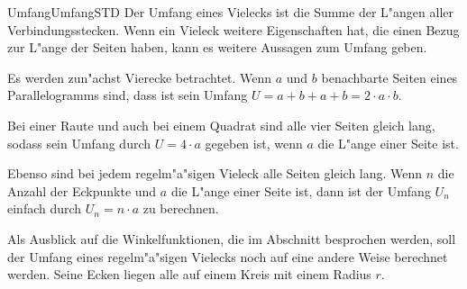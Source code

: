 \begin{MXContent}{Umfang}{Umfang}{STD}
Der Umfang eines Vielecks ist die Summe der L"angen aller Verbindungsstecken.
Wenn ein Vieleck weitere Eigenschaften hat, die einen Bezug zur L"ange der 
Seiten haben, kann es weitere Aussagen zum Umfang geben.

Es werden zun"achst Vierecke betrachtet. Wenn $a$ und $b$ 
benachbarte Seiten eines Parallelogramms sind, dass ist sein Umfang
$U = a + b + a + b = 2 \cdot a \cdot b$.

Bei einer Raute und auch bei einem Quadrat sind alle vier Seiten gleich lang, 
sodass sein Umfang durch $U = 4 \cdot a$ gegeben ist, wenn $a$ die L"ange einer 
Seite ist. 

Ebenso sind bei jedem regelm"a"sigen Vieleck alle Seiten gleich lang. Wenn $n$ 
die Anzahl der Eckpunkte und $a$ die L"ange einer Seite ist, dann ist der 
Umfang $U_n$ einfach durch $U_n = n \cdot a$ zu berechnen.

Als Ausblick auf die Winkelfunktionen, die im Abschnitt 
besprochen werden, soll der Umfang eines regelm"a"sigen Vielecks noch auf eine 
andere Weise berechnet werden.
Seine Ecken liegen alle auf einem Kreis mit einem Radius $r$. 

\begin{center}
\end{center}


\end{MXContent}
